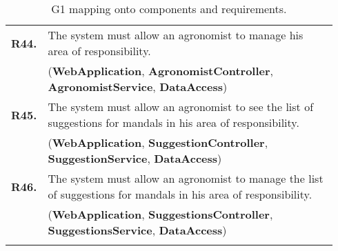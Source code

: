 \begin{longtable}{p{0.06\linewidth} p{0.88\linewidth}}
	\textbf{R44.} & The system must allow an agronomist to manage his area of responsibility.\\
	& (\textbf{WebApplication}, \textbf{AgronomistController}, \textbf{AgronomistService}, \textbf{DataAccess})\\
	\textbf{R45.} & The system must allow an agronomist to see the list of suggestions for mandals in his area of responsibility.\\
	& (\textbf{WebApplication}, \textbf{SuggestionController}, \textbf{SuggestionService}, \textbf{DataAccess})\\
	\textbf{R46.} & The system must allow an agronomist to manage the list of suggestions for mandals in his area of responsibility.\\
	& (\textbf{WebApplication}, \textbf{SuggestionsController}, \textbf{SuggestionsService}, \textbf{DataAccess})\\
	
    \bottomrule
    \caption{G1 mapping onto components and requirements.}
\end{longtable}

